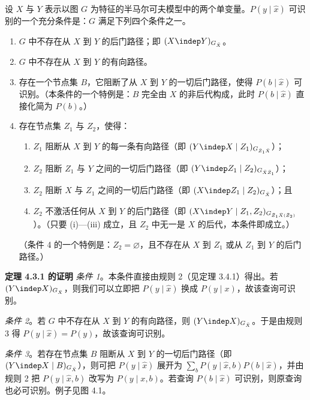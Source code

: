 \begin{theorem}
设 $X$ 与 $Y$ 表示以图 $G$ 为特征的半马尔可夫模型中的两个单变量。$P(y\mid\hat{x})$ 可识别的一个充分条件是：$G$ 满足下列四个条件之一。
\begin{enumerate}[label=\arabic*.,leftmargin=2.2em]
\item $G$ 中不存在从 $X$ 到 $Y$ 的后门路径；即 $(X\indep Y)_{G_{\bar{X}}}$。
\item $G$ 中不存在从 $X$ 到 $Y$ 的有向路径。
\item 存在一个节点集 $B$，它阻断了从 $X$ 到 $Y$ 的一切后门路径，使得 $P(b\mid\hat{x})$ 可识别。（本条件的一个特例是：$B$ 完全由 $X$ 的非后代构成，此时 $P(b\mid\hat{x})$ 直接化简为 $P(b)$。）
\item 存在节点集 $Z_1$ 与 $Z_2$，使得：
\begin{enumerate}[label=(\roman*),leftmargin=2.6em]
\item $Z_1$ 阻断从 $X$ 到 $Y$ 的每一条有向路径（即 $(Y\indep X\mid Z_1)_{G_{\bar{Z}_1\bar{X}}}$）；
\item $Z_2$ 阻断 $Z_1$ 与 $Y$ 之间的一切后门路径（即 $(Y\indep Z_1\mid Z_2)_{G_{\bar{X}\bar{Z}_1}}$）；
\item $Z_2$ 阻断 $X$ 与 $Z_1$ 之间的一切后门路径（即 $(X\indep Z_1\mid Z_2)_{G_{\bar{X}}}$）；且
\item $Z_2$ 不激活任何从 $X$ 到 $Y$ 的后门路径（即 $(X\indep Y\mid Z_1,Z_2)_{G_{\bar{Z}_1\bar{X}(\bar{Z}_2)}}$）。（只要 (i)—(iii) 成立，且 $Z_2$ 中无一是 $X$ 的后代，本条件即成立。）
\end{enumerate}
（条件 4 的一个特例是：$Z_2=\varnothing$，且不存在从 $X$ 到 $Z_1$ 或从 $Z_1$ 到 $Y$ 的后门路径。）
\end{enumerate}
\end{theorem}

\noindent\textbf{定理 4.3.1 的证明}\quad
\emph{条件 1}。本条件直接由规则 2（见定理 3.4.1）得出。若 $(Y\indep X)_{G_{\bar{X}}}$，则我们可以立即把 $P(y\mid\hat{x})$ 换成 $P(y\mid x)$，故该查询可识别。

\emph{条件 2}。若 $G$ 中不存在从 $X$ 到 $Y$ 的有向路径，则 $(Y\indep X)_{G_{\bar{X}}}$。于是由规则 3 得 $P(y\mid\hat{x})=P(y)$，故该查询可识别。

\emph{条件 3}。若存在节点集 $B$ 阻断从 $X$ 到 $Y$ 的一切后门路径（即 $(Y\indep X\mid B)_{G_{\bar{X}}}$），则可把 $P(y\mid\hat{x})$ 展开为 $\sum_b P(y\mid\hat{x},b)P(b\mid\hat{x})$，并由规则 2 把 $P(y\mid\hat{x},b)$ 改写为 $P(y\mid x,b)$。若查询 $P(b\mid\hat{x})$ 可识别，则原查询也必可识别。例子见图 4.1。

